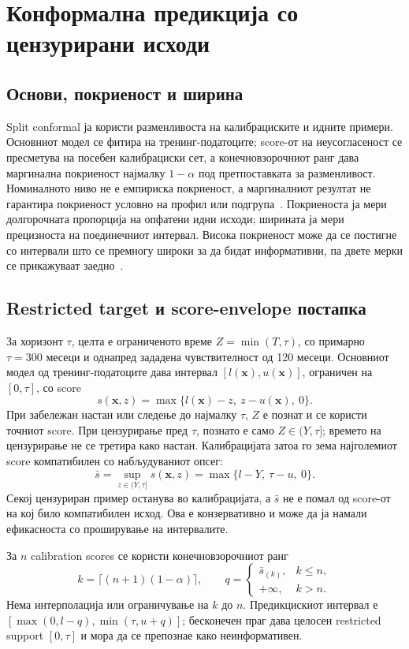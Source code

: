\documentclass[12pt]{article}
\begin{document}
\section{Конформална предикција со цензурирани исходи}

\subsection{Основи, покриеност и ширина}

Split conformal ја користи разменливоста на калибрациските и идните примери.
Основниот модел се фитира на тренинг-податоците; score-от на неусогласеност се
пресметува на посебен калибрациски сет, а конечновзорочниот ранг дава
маргинална покриеност најмалку $1-\alpha$ под претпоставката за разменливост.
Номиналното ниво не е емпириска покриеност, а маргиналниот резултат не гарантира
покриеност условно на профил или подгрупа~\cite{angelopoulos2023,lei2018}.
Покриеноста ја мери долгорочната пропорција на опфатени идни исходи; ширината
ја мери прецизноста на поединечниот интервал. Висока покриеност може да се
постигне со интервали што се премногу широки за да бидат информативни, па двете
мерки се прикажуваат заедно~\cite{angelopoulos2023}.

\subsection{Restricted target и score-envelope постапка}

За хоризонт $\tau$, целта е ограниченото време $Z=\min(T,\tau)$, со примарно
$\tau=300$ месеци и однапред зададена чувствителност од 120 месеци. Основниот
модел од тренинг-податоците дава интервал $[l(\mathbf{x}),u(\mathbf{x})]$,
ограничен на $[0,\tau]$, со score
\[
s(\mathbf{x},z)=\max\{l(\mathbf{x})-z,\ z-u(\mathbf{x}),\ 0\}.
\]
При забележан настан или следење до најмалку $\tau$, $Z$ е познат и се користи
точниот score. При цензурирање пред $\tau$, познато е само $Z\in(Y,\tau]$;
времето на цензурирање не се третира како настан. Калибрацијата затоа го зема
најголемиот score компатибилен со набљудуваниот опсег:
\[
\bar{s}=\sup_{z\in(Y,\tau]}s(\mathbf{x},z)
=\max\{l-Y,\ \tau-u,\ 0\}.
\]
Секој цензуриран пример останува во калибрацијата, а $\bar{s}$ не е помал од
score-от на кој било компатибилен исход. Ова е конзервативно и може да ја
намали ефикасноста со проширување на интервалите.

За $n$ calibration scores се користи конечновзорочниот ранг
\[
k=\lceil(n+1)(1-\alpha)\rceil,\qquad
q=\begin{cases}\bar{s}_{(k)},&k\leq n,\\+\infty,&k>n.\end{cases}
\]
Нема интерполација или ограничување на $k$ до $n$. Предикцискиот интервал е
$[\max(0,l-q),\min(\tau,u+q)]$; бесконечен праг дава целосен restricted
support $[0,\tau]$ и мора да се препознае како неинформативен.
\end{document}

